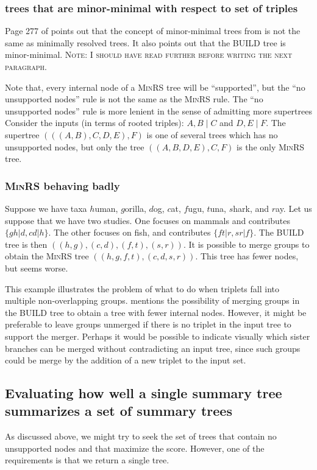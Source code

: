 \documentclass[11pt]{article}
\begin{document}
\subsubsection{trees that are minor-minimal with respect to set of triples}

Page 277 of \citet{JanssonLL2012} points out that the concept of minor-minimal trees from \citet{Semple2003} is not the same as minimally resolved trees.  It also points out that the BUILD tree is minor-minimal.  \textsc{Note: I should have read \citet{JanssonLL2012} further before writing the next paragraph.}

Note that, every internal node of a \textsc{MinRS} tree will be ``supported'', but the
    ``no unsupported nodes'' rule is not the same as the \textsc{MinRS} rule.
The ``no unsupported nodes'' rule is more lenient in the sense of admitting more supertrees
Consider the inputs (in terms of rooted triples): $A,B\mid C$ and $D,E\mid F$.
The supertree $(((A,B),C,D,E),F)$ is one of several trees which has no unsupported nodes, but 
    only the tree $((A,B,D,E),C,F)$ is the only \textsc{MinRS} tree.

\subsubsection{\textsc{MinRS} behaving badly}

Suppose we have taxa $h$uman, $g$orilla, $d$og, $c$at, $f$ugu, $t$una,
$s$hark, and $r$ay.  Let us suppose that we have two studies.  One focuses on mammals and
contributes $\{gh|d,cd|h\}$.  The other focuses on fish, and contributes
$\{ft|r,sr|f\}$.  The \textsc{BUILD} tree is then
$((h,g),(c,d),(f,t),(s,r))$.  It is possible to merge groups to obtain
the \textsc{MinRS} tree $((h,g,f,t),(c,d,s,r))$.  This tree has fewer
nodes, but seems worse. %

This example illustrates the problem of what to do when triplets
fall into multiple non-overlapping groups.  \citet{JanssonLL2012}
mentions the possibility of merging groups in the \textsc{BUILD} tree
to obtain a tree with fewer internal nodes.  However, it might be
preferable to leave groups unmerged if there is no triplet in the
input tree to support the merger.  Perhaps it would be possible to
indicate visually which sister branches can be merged without
contradicting an input tree, since such groups could be merge by the
addition of a new triplet to the input set.


\subsection{Evaluating how well a single summary tree summarizes a set of summary trees}\label{treeAdmissibility}
As discussed above, we might try to seek the set of trees that contain no unsupported nodes and that
    maximize the \SWIPSD score.
However, one of the requirements is that we return a single tree.
\end{document}

